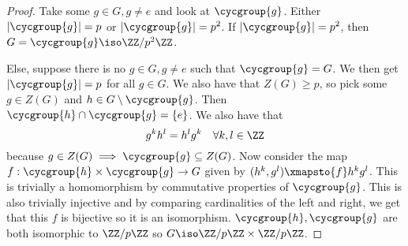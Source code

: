 \begin{proof}
Take some $g \in G, g \neq e$ and look at $\cycgroup{g}$. Either $\lvert
\cycgroup{g} \rvert = p$ or $\lvert \cycgroup{g} \rvert = p^2$. If
$\lvert \cycgroup{g} \rvert = p^2$, then $G = \cycgroup{g} \iso \ZZ /
p^2 \ZZ$.

Else, suppose there is no $g \in G, g \neq e$ such that $\cycgroup{g} =
G$. We then get $\lvert \cycgroup{g} \rvert = p$ for all $g \in G$. We
also have that $Z(G) \geq p$, so pick some $g \in Z(G)$ and $h \in G
\setminus \cycgroup{g}$. Then $\cycgroup{h} \cap \cycgroup{g} = \lbrace
e \rbrace$. We also have that
\[ g^k h^l = h^l g^k \quad \forall k, l \in \ZZ \]
because $g \in Z(G) \implies \cycgroup{g} \subseteq Z(G)$. Now consider
the map $f : \cycgroup{h} \times \cycgroup{g} \to G$ given by $(h^k,
g^l) \xmapsto{f} h^k g^l$. This is trivially a homomorphism by
commutative properties of $\cycgroup{g}$. This is also trivially
injective and by comparing cardinalities of the left and right, we get
that this $f$ is bijective so it is an isomorphism. $\cycgroup{h},
\cycgroup{g}$ are both isomorphic to $\ZZ / p \ZZ$ so $G \iso \ZZ / p
\ZZ \times \ZZ / p \ZZ$.
\end{proof}
